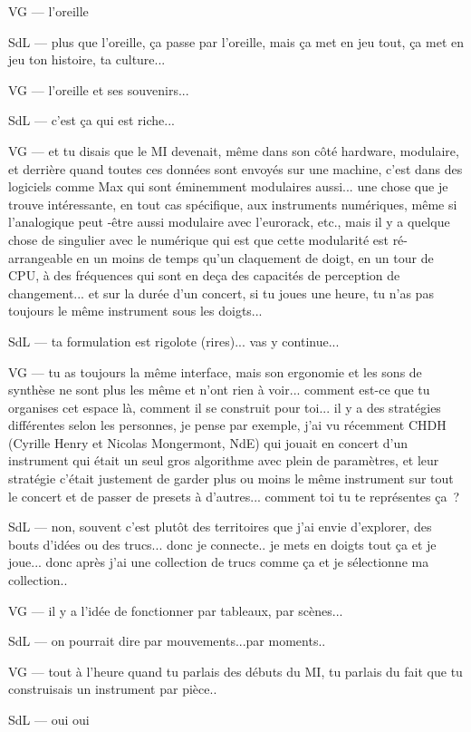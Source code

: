 VG — l'oreille 

SdL — plus que l'oreille, ça passe par l'oreille, mais ça met en jeu tout, ça met en jeu ton histoire, ta culture... 

VG — l'oreille et ses souvenirs... 

SdL — c'est ça qui est riche... 

VG — et tu disais que le MI devenait, même dans son côté hardware, modulaire, et derrière quand toutes ces données sont envoyés sur une machine, c'est dans des logiciels comme Max qui sont éminemment modulaires aussi... une chose que je trouve intéressante, en tout cas spécifique, aux instruments numériques, même si l'analogique peut -être aussi modulaire avec l'eurorack, etc., mais il y a quelque chose de singulier avec le numérique qui est que cette modularité est ré-arrangeable en un moins de temps qu'un claquement de doigt, en un tour de CPU, à des fréquences qui sont en deça des capacités de perception de changement... et sur la durée d'un concert, si tu joues une heure, tu n'as pas toujours le même instrument sous les doigts... 

SdL — ta formulation est rigolote (rires)... vas y continue... 

VG — tu as toujours la même interface, mais son ergonomie et les sons de synthèse ne sont plus les même et n'ont rien à voir... comment est-ce que tu organises cet espace là, comment il se construit pour toi... il y a des stratégies différentes selon les personnes, je pense par exemple, j'ai vu récemment CHDH (Cyrille Henry et Nicolas Mongermont, NdE) qui jouait en concert d'un instrument qui était un seul gros algorithme avec plein de paramètres, et leur stratégie c'était justement de garder plus ou moins le même instrument sur tout le concert et de passer de presets à d'autres... comment toi tu te représentes ça ? 

SdL — non, souvent c'est plutôt des territoires que j'ai envie d'explorer, des bouts d'idées ou des trucs... donc je connecte.. je mets en doigts tout ça et je joue... donc après j'ai une collection de trucs comme ça et je sélectionne ma collection..  

VG — il y a l'idée de fonctionner par tableaux, par scènes... 

SdL — on pourrait dire par mouvements...par moments.. 

VG — tout à l'heure quand tu parlais des débuts du MI, tu parlais du fait que tu construisais un instrument par pièce.. 

SdL — oui oui 

